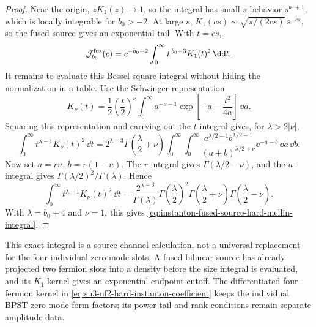 \begin{proof}
Near the origin, \(zK_1(z)\to1\), so the integral has small-\(s\) behavior
\(s^{b_0+1}\), which is locally integrable for \(b_0>-2\).  At large \(s\),
\(K_1(cs)\sim\sqrt{\pi/(2cs)}\,\ee^{-cs}\), so the fused source gives an
exponential tail.  With \(t=cs\),
\[
  \mathcal J_{b_0}^{\rm fus}(c)
  =
  c^{-b_0-2}
  \int_0^\infty t^{\,b_0+3}K_1(t)^2\,\dd t .
\]
It remains to evaluate this Bessel-square integral without hiding the
normalization in a table.  Use the Schwinger representation
\[
  K_\nu(t)
  =
  \frac12\left(\frac t2\right)^\nu
  \int_0^\infty
    a^{-\nu-1}\exp\!\left[-a-\frac{t^2}{4a}\right]\,\dd a .
\]
Squaring this representation and carrying out the \(t\)-integral gives, for
\(\lambda>2|\nu|\),
\[
  \int_0^\infty t^{\lambda-1}K_\nu(t)^2\,\dd t
  =
  2^{\lambda-3}
  \Gamma\!\left(\frac{\lambda}{2}+\nu\right)
  \int_0^\infty\!\!\int_0^\infty
    \frac{
      a^{\lambda/2-1}b^{\lambda/2-1}
    }{
      (a+b)^{\lambda/2+\nu}
    }
    \ee^{-a-b}\,\dd a\,\dd b .
\]
Now set \(a=ru\), \(b=r(1-u)\).  The \(r\)-integral gives
\(\Gamma(\lambda/2-\nu)\), and the \(u\)-integral gives
\(\Gamma(\lambda/2)^2/\Gamma(\lambda)\).  Hence
\[
  \int_0^\infty t^{\lambda-1}K_\nu(t)^2\,\dd t
  =
  \frac{2^{\lambda-3}}{\Gamma(\lambda)}
  \Gamma\!\left(\frac{\lambda}{2}\right)^2
  \Gamma\!\left(\frac{\lambda}{2}+\nu\right)
  \Gamma\!\left(\frac{\lambda}{2}-\nu\right).
\]
With \(\lambda=b_0+4\) and \(\nu=1\), this gives
\eqref{eq:instanton-fused-source-hard-mellin-integral}.
\end{proof}

This exact integral is a source-channel calculation, not a universal
replacement for the four individual zero-mode slots.  A fused bilinear source
has already projected two fermion slots into a density before the size
integral is evaluated, and its \(K_1\)-kernel gives an exponential endpoint
cutoff.  The differentiated four-fermion kernel in
\eqref{eq:su3-nf2-hard-instanton-coefficient} keeps the individual BPST
zero-mode form factors; its power tail and rank conditions remain separate
amplitude data.

